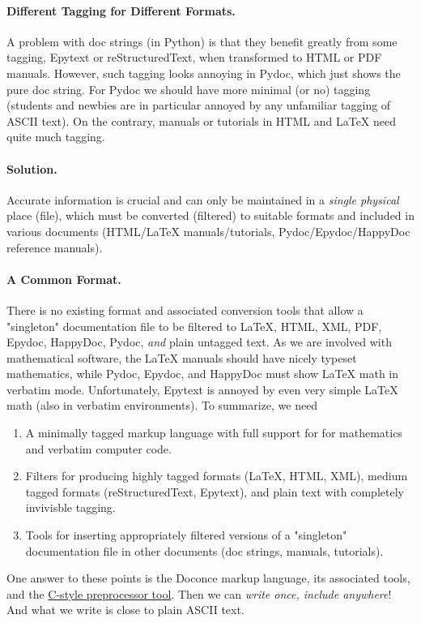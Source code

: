\documentclass{article}
\begin{document}
\paragraph{Different Tagging for Different Formats.}
A problem with doc
strings (in Python) is that they benefit greatly from some tagging,
Epytext or reStructuredText, when transformed to HTML or PDF
manuals. However, such tagging looks annoying in Pydoc, which just
shows the pure doc string. For Pydoc we should have more minimal (or
no) tagging (students and newbies are in particular annoyed by any
unfamiliar tagging of ASCII text). On the contrary, manuals or
tutorials in HTML and {\LaTeX} need quite much tagging.

\paragraph{Solution.}
Accurate information is crucial and can only be
maintained in a \emph{single physical} place (file), which must be
converted (filtered) to suitable formats and included in various
documents (HTML/{\LaTeX} manuals/tutorials, Pydoc/Epydoc/HappyDoc
reference manuals).

\paragraph{A Common Format.}
There is no existing format and associated
conversion tools that allow a "singleton" documentation file to be
filtered to {\LaTeX}, HTML, XML, PDF, Epydoc, HappyDoc, Pydoc, \emph{and} plain
untagged text. As we are involved with mathematical software, the
{\LaTeX} manuals should have nicely typeset mathematics, while Pydoc,
Epydoc, and HappyDoc must show {\LaTeX} math in verbatim mode.
Unfortunately, Epytext is annoyed by even very simple {\LaTeX} math (also
in verbatim environments). To summarize, we need

\begin{enumerate}
 \item A minimally tagged markup language with full support for 
    for mathematics and verbatim computer code.
 \item Filters for producing highly tagged formats ({\LaTeX}, HTML, XML),
    medium tagged formats (reStructuredText, Epytext), and plain
    text with completely invivisble tagging. 
 \item Tools for inserting appropriately filtered versions of a "singleton"
    documentation file in other documents (doc strings, manuals, tutorials).
\end{enumerate}
One answer to these points is the Doconce markup language, its associated
tools, and the \href{http://code.google.com/p/preprocess/}{C-style preprocessor tool}.
Then we can \emph{write once, include anywhere}!
And what we write is close to plain ASCII text.
\end{document}
